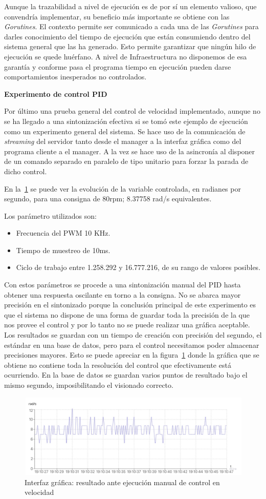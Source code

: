 Aunque la trazabilidad a nivel de ejecución es de por sí un elemento valioso, que convendría implementar, su beneficio más importante se obtiene con las \textit{Gorutines}.
El contexto permite ser comunicado a cada una de las \textit{Gorutines} para darles conocimiento del tiempo de ejecución que están consumiendo dentro del sistema general que las ha generado.
Esto permite garantizar que ningún hilo de ejecución se quede huérfano.
A nivel de Infraestructura no disponemos de esa garantía y conforme pasa el programa tiempo en ejecución pueden darse comportamientos inesperados no controlados.

\textbf{Experimento de control PID}

Por último una prueba general del control de velocidad implementado, aunque no se ha llegado a una sintonización efectiva si se tomó este ejemplo de ejecución como un experimento general del sistema.
Se hace uso de la comunicación de \textit{streaming} del servidor tanto desde el manager a la interfaz gráfica como del programa cliente a el manager.
A la vez se hace uso de la asincronía al disponer de un comando separado en paralelo de tipo unitario para forzar la parada de dicho control.

En la~\cref{fig:UIRunner} se puede ver la evolución de la variable controlada, en radianes por segundo, para una consigna de 80rpm;
8.37758 rad/s equivalentes.

Los parámetro utilizados son:
\begin{itemize}
    \item Frecuencia del PWM 10 KHz.
    \item Tiempo de muestreo de 10ms.
    \item Ciclo de trabajo entre 1.258.292 y 16.777.216, de su rango de valores posibles.
\end{itemize}

Con estos parámetros se procede a una sintonización manual del PID hasta obtener una respuesta oscilante en torno a la consigna.
No se abarca mayor precisión en el sintonizado porque la conclusión principal de este experimento es que el sistema no dispone de una forma de guardar toda la precisión de la que nos provee el control y por lo tanto no se puede realizar una gráfica aceptable.
Los resultados se guardan con un tiempo de creación con precisión del segundo, el estándar en una base de datos, pero para el control necesitamos poder almacenar precisiones mayores.
Esto se puede apreciar en la figura~\cref{fig:UIRunner} donde la gráfica que se obtiene no contiene toda la resolución del control que efectivamente está ocurriendo.
En la base de datos se guardan varios puntos de resultado bajo el mismo segundo, imposibilitando el visionado correcto.


\begin{figure}[H]
    \centering
    \includegraphics[height=0.2\textheight]{./part/Ejecucion/Seguimiento/PuestaAPunto/img/UIRunner}
    \caption{Interfaz gráfica: resultado ante ejecución manual de control en velocidad}\label{fig:UIRunner}
\end{figure}